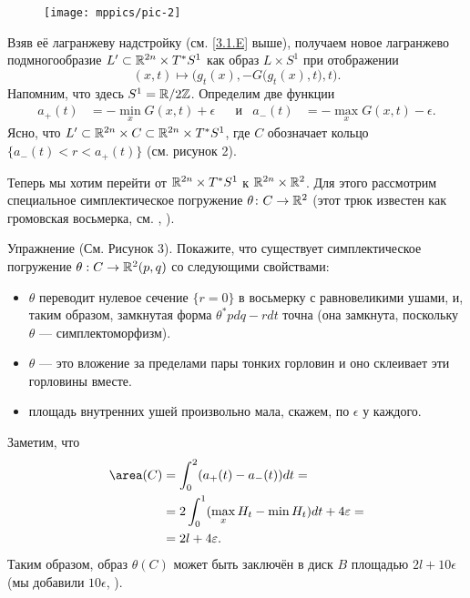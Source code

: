 \begin{figure}[ht!]
\vskip-0mm
\centering
\texttt{[image: mppics/pic-2]}
\caption{}\label{pic-2}
\vskip0mm
\end{figure}

Взяв её лагранжеву надстройку (см. \ref{3.1.E} выше),
получаем новое лагранжево подмногообразие $L' \subset \RR^{2n} \z\times T^{\ast} S^1$ как образ $L \times S^1$ при отображении 
\[(x, t) \mapsto \Big(g_t (x), -G \big(g_t (x), t\big), t\Big).\]
Напомним, что здесь $S^1 = \mathbb{R} / 2\mathbb{Z}$.
Определим две функции 
\begin{align*}a_+ (t) &= - \min_x G (x, t) + \epsilon
&&\text{и}&
a_- (t) &= - \max_x G (x, t) - \epsilon.
\end{align*}
Ясно, что $L' \subset \mathbb{R}^{2n} \times C \subset \mathbb{R}^{2n} \times T^\ast S^1$, где $C$ обозначает кольцо 
$\{a_- (t) <r <a_+ (t)\}$
(см. рисунок 2).

Теперь мы хотим перейти от $\mathbb{R}^{2n} \times T^{\ast} S^1$ к $\mathbb{R}^{2n} \times \mathbb{R}^2$.
Для этого рассмотрим специальное симплектическое погружение $\theta\colon C \to \mathbb{R}^2$
(этот трюк известен как громовская восьмерка, см. \cite{G1}, \cite{AL}).

\begin{thm*}{Упражнение}
(См. Рисунок 3).
Покажите, что существует симплектическое погружение $\theta: C \to \mathbb{R}^2 (p, q)$ со следующими свойствами: 
\begin{itemize}
\item $\theta$ переводит нулевое сечение $\{r = 0\}$ в восьмерку с равновеликими ушами, и, таким образом, замкнутая форма $\theta^\ast pdq - rdt$ точна (она замкнута, поскольку $\theta$ --- симплектоморфизм).
\item $\theta$ --- это вложение за пределами пары тонких горловин и оно склеивает эти горловины вместе.
\item площадь внутренних ушей произвольно мала, скажем, по $\epsilon$ у каждого. 
\end{itemize}
\end{thm*}

Заметим, что \?{}{$\area=\Area$}
\begin{align*}
\area (C) 
&= \int_0^2(a_+ (t) - a_- (t)) dt = 
\\
&=2 \int_0^1(\max_x H_t - \min H_t) dt + 4\epsilon =
\\
&=2l + 4\epsilon.
\end{align*}
Таким образом, образ $\theta (C)$ может быть заключён в диск $B$
площадью $2l + 10\epsilon$ (мы добавили $10\epsilon$, ).

